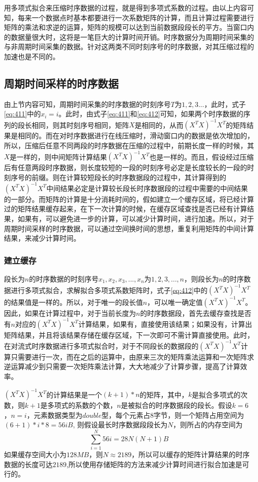 用多项式拟合来压缩时序数据的过程，就是得到多项式系数的过程。由以上内容可知，每来一个数据点时基本都要进行一次系数矩阵的计算，而且计算过程需要进行矩阵的乘法和求逆的运算，矩阵的规模可以达到当前数据段段长的平方。当窗口内的数据量很大时，这将是一笔巨大的计算时间开销。时序数据分为周期时间采集的与非周期时间采集的数据。针对这两类不同时刻序号的时序数据，对其压缩过程的加速也是不同的。

\subsection{周期时间采样的时序数据}
由上节内容可知，周期时间采集的时序数据的时刻序号$T$为$1,2,3...$，此时，式子\ref{eq:411}中的$x_i = i$。此时，由式子\ref{eq:411}和\ref{eq:412}可知，如果两个时序数据的序列的段长相同，则其时刻序号相同，矩阵$X$是相同的，从而$(X^TX)^{-1}X^T$的矩阵结果是相同的。而在对时序数据进行在线压缩时，滑动窗口内的数据是依次增加的，所以，压缩后任意不同两段的时序数据在压缩的过程中，前期长度一样的时候，其$X$是一样的，则中间矩阵计算结果$(X^TX)^{-1}X^T$也是一样的。而且，假设经过压缩后有任意两段时序数据，则长度较短的一段的时刻序号必定是长度较长的一段的时刻序号的前缀。则在计算较短段长的时序数据段的过程中，其计算得到的$(X^TX)^{-1}X^T$中间结果必定是计算较长段长时序数据段的过程中需要的中间结果的一部分。而矩阵的计算是十分消耗时间的，假如建立一个缓存区域，将已经计算过的矩阵结果缓存起来，在下一次计算的时候，在缓存区域查找是否已经有计算结果，如果有，可以避免进一步的计算，可以减少计算时间，进行加速。所以，对于周期时间采样的时序数据，可以通过空间换时间的思想，重复利用矩阵的中间计算结果，来减少计算时间。

\subsubsection{建立缓存}
段长为$n$的时序数据的时刻序号$x_1,x_2,x_3,...,x_n$为$1,2,3,...,n$，则段长为$n$的时序数据进行多项式拟合，求解拟合多项式系数矩阵时，式子\ref{eq:412}中的$(X^TX)^{-1}X^T$的结果值是一样的。所以，对于唯一的段长值$n$，可以唯一确定值$(X^TX)^{-1}X^T$。因此，如果在计算过程中，对于当前长度为$n$的时序数据段，首先去缓存查找是否有$n$对应的$(X^TX)^{-1}X^T$计算结果，如果有，直接使用该结果；如果没有，计算出矩阵结果，并且将该结果存储在缓存区域，下一次即可不需计算直接使用。此时，在对流式时序数据进行多项式拟合时，对于不同段长的数据段的$(X^TX)^{-1}X^T$计算只需要进行一次，而在之后的运算中，由原来三次的矩阵乘法运算和一次矩阵求逆运算减少到只需要一次矩阵乘法计算，大大地减少了计算步骤，提高了计算效率。

$(X^TX)^{-1}X^T$的计算结果是一个$(k+1)*n$的矩阵，其中，$k$是拟合多项式的次数，则$k+1$是多项式的系数的个数，$n$是被拟合的时序数据段的段长。假设$k = 6$，$n = i$，元素数据类型为$double$型，每个元素占$8$字节，则一个矩阵占用空间为$(6+1)*i*8 = 56iB$, 则假设最长时序数据段段长为$N$，则所占的内存空间为
\begin{equation}
\sum_{i=1}^{N}56i = 28N(N+1) B
\end{equation}
如果缓存空间大小为$128MB$，则$N \approx 2189$，所以可以缓存的矩阵计算结果的时序数据的长度可达$2189$,所以使用存储矩阵的方法来减少计算时间进行拟合加速是可行的。

